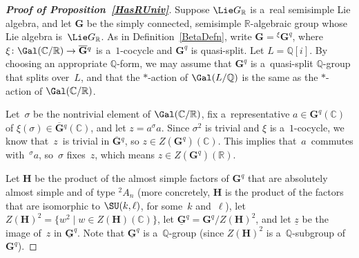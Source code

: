 \begin{proof}[\bf Proof of Proposition~\ref{HasRUniv}] Suppose $\Lie G_\mathbb{R}$ is a~real semisimple Lie algebra, and let $\mathbf{G}$ be the
simply connected, semisimple $\mathbb{R}$-algebraic group whose Lie algebra is~$\Lie G_\mathbb{R}$.
As in Def\/inition~\ref{BetaDefn}, write $\mathbf{G} = {}^\xi \mathbf{G}^q$, where $\xi \colon \Gal(\mathbb{C}/\mathbb{R}) \to
\overline{\mathbf{G}}{}^q$ is a~$1$-cocycle and $\mathbf{G}^q$ is quasi-split.
Let $L = \mathbb{Q}[i]$.
By choosing an appropriate $\mathbb{Q}$-form, we may assume that $\mathbf{G}^q$ is a~quasi-split $\mathbb{Q}$-group that
splits over~$L$, and that the $*$-action of $\Gal(L/\mathbb{Q})$ is the same as the $*$-action of
$\Gal(\mathbb{C}/\mathbb{R})$.

Let~$\sigma$ be the nontrivial element of $\Gal(\mathbb{C}/\mathbb{R})$, f\/ix a~representative $a \in
\mathbf{G}^q(\mathbb{C})$ of $\xi(\sigma) \in \overline{\mathbf{G}}{}^q(\mathbb{C})$, and let $z = a {}^\sigma a$.
Since $\sigma^2$ is trivial and $\xi$ is a~$1$-cocycle, we know that~$z$~is trivial in $\overline{\mathbf{G}}{}^q$, so $z
\in Z(\mathbf{G}^q)(\mathbb{C})$.
This implies that~$a$~commutes with~${}^\sigma a$, so~$\sigma$ f\/ixes~$z$, which means $z \in
Z(\mathbf{G}^q)(\mathbb{R})$.

Let $\mathbf{H}$ be the product of the almost simple factors of $\mathbf{G}^q$ that are absolutely almost simple and of
type ${}^{2} A_n$ (more concretely, $\mathbf{H}$ is the product of the factors that are isomorphic to $\SU(k,\ell)$, for
some~$k$ and~$\ell$), let $Z(\mathbf{H})^2 = \{ w^2 \mid w \in Z(\mathbf{H})(\mathbb{C}) \}$, let
$\underline{\mathbf{G}}^q = \mathbf{G}^q/Z(\mathbf{H})^2$, and let $\underline z$ be the image of~$z$ in
$\underline{\mathbf{G}}^q$.
Note that $\underline{\mathbf{G}}^q$ is a~$\mathbb{Q}$-group (since $Z(\mathbf{H})^2$ is a~$\mathbb{Q}$-subgroup
of~$\mathbf{G}^q$).


\end{proof}
